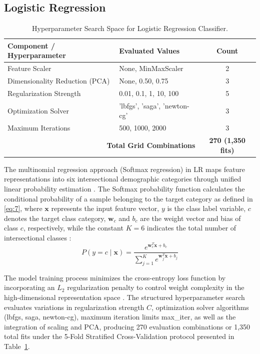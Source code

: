 \subsection{Logistic Regression}
\label{sec:logistic_regression}

\begin{table}[htbp]
\caption{Hyperparameter Search Space for Logistic Regression Classifier.}
\label{tab:V}
\centering
\begin{tabular}{llc}
\toprule
Component / Hyperparameter & Evaluated Values & Count \\
\midrule
Feature Scaler & None, MinMaxScaler & 2 \\
Dimensionality Reduction (PCA) & None, 0.50, 0.75 & 3 \\
Regularization Strength & 0.01, 0.1, 1, 10, 100 & 5 \\
Optimization Solver & 'lbfgs', 'saga', 'newton-cg' & 3 \\
Maximum Iterations & 500, 1000, 2000 & 3 \\
\midrule
\multicolumn{2}{r}{\textbf{Total Grid Combinations}} & \textbf{270 (1,350 fits)} \\
\bottomrule
\end{tabular}
\end{table}

The multinomial regression approach (Softmax regression) in LR maps feature representations into six intersectional demographic categories through unified linear probability estimation \cite{ref37}. The Softmax probability function calculates the conditional probability of a sample belonging to the target category as defined in \eqref{eq:7}, where $\mathbf{x}$ represents the input feature vector, $y$ is the class label variable, $c$ denotes the target class category, $\mathbf{w}_c$ and $b_c$ are the weight vector and bias of class $c$, respectively, while the constant $K = 6$ indicates the total number of intersectional classes \cite{ref38}:
\begin{equation}
P(y = c \mid \mathbf{x}) = \frac{e^{\mathbf{w}_c^T \mathbf{x} + b_c}}{\sum_{j=1}^K e^{\mathbf{w}_j^T \mathbf{x} + b_j}}
\label{eq:7}
\end{equation}

The model training process minimizes the cross-entropy loss function by incorporating an $L_2$ regularization penalty to control weight complexity in the high-dimensional representation space \cite{ref39}. The structured hyperparameter search evaluates variations in regularization strength $C$, optimization solver algorithms (lbfgs, saga, newton-cg), maximum iteration limits max\_iter, as well as the integration of scaling and PCA, producing 270 evaluation combinations or 1,350 total fits under the 5-Fold Stratified Cross-Validation protocol presented in Table~\ref{tab:V}.
